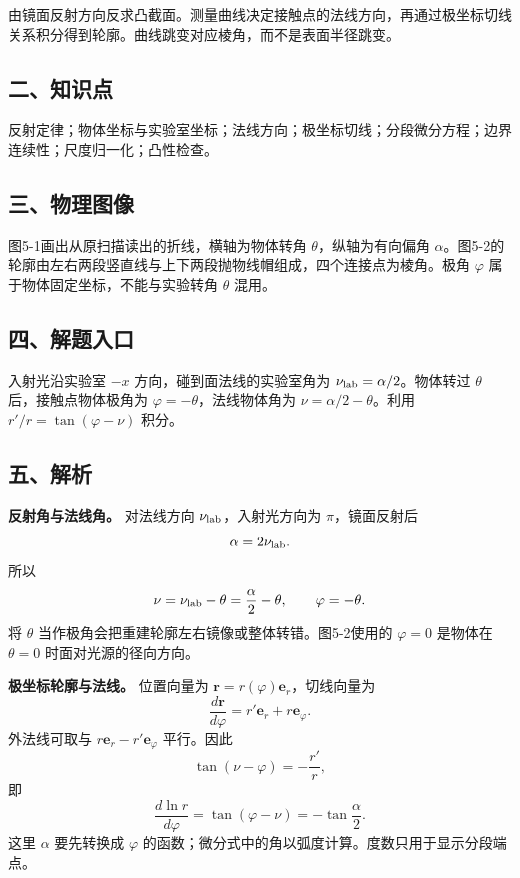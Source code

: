 \documentclass[12pt,a4paper,UTF8]{ctexart}
\begin{document}
由镜面反射方向反求凸截面。测量曲线决定接触点的法线方向，再通过极坐标切线关系积分得到轮廓。曲线跳变对应棱角，而不是表面半径跳变。

\subsection{二、知识点}\label{ux4e8cux77e5ux8bc6ux70b9-4}

反射定律；物体坐标与实验室坐标；法线方向；极坐标切线；分段微分方程；边界连续性；尺度归一化；凸性检查。

\subsection{三、物理图像}\label{ux4e09ux7269ux7406ux56feux50cf-4}

图5-1画出从原扫描读出的折线，横轴为物体转角 \(\theta\)，纵轴为有向偏角
\(\alpha\)。图5-2的轮廓由左右两段竖直线与上下两段抛物线帽组成，四个连接点为棱角。极角
\(\varphi\) 属于物体固定坐标，不能与实验转角 \(\theta\) 混用。

\subsection{四、解题入口}\label{ux56dbux89e3ux9898ux5165ux53e3-4}

入射光沿实验室 \(-x\) 方向，碰到面法线的实验室角为
\(\nu_{\rm lab}=\alpha/2\)。物体转过 \(\theta\) 后，接触点物体极角为
\(\varphi=-\theta\)，法线物体角为 \(\nu=\alpha/2-\theta\)。利用
\(r'/r=\tan(\varphi-\nu)\) 积分。

\subsection{五、解析}\label{ux4e94ux89e3ux6790-4}

\textbf{反射角与法线角。} 对法线方向 \(\nu_{\rm lab}\)，入射光方向为
\(\pi\)，镜面反射后 \[
\alpha=2\nu_{\rm lab}.
\] 所以 \[
\nu=\nu_{\rm lab}-\theta=\frac{\alpha}{2}-\theta,
\qquad\varphi=-\theta.
\] 将 \(\theta\) 当作极角会把重建轮廓左右镜像或整体转错。图5-2使用的
\(\varphi=0\) 是物体在 \(\theta=0\) 时面对光源的径向方向。

\textbf{极坐标轮廓与法线。} 位置向量为
\(\boldsymbol r=r(\varphi)\boldsymbol e_r\)，切线向量为 \[
\frac{d\boldsymbol r}{d\varphi}
=r'\boldsymbol e_r+r\boldsymbol e_\varphi.
\] 外法线可取与 \(r\boldsymbol e_r-r'\boldsymbol e_\varphi\) 平行。因此
\[
\tan(\nu-\varphi)=-\frac{r'}r,
\] 即 \[
\boxed{\frac{d\ln r}{d\varphi}
=\tan(\varphi-\nu)
=-\tan\frac{\alpha}{2}}.
\] 这里 \(\alpha\) 要先转换成 \(\varphi\)
的函数；微分式中的角以弧度计算。度数只用于显示分段端点。
\end{document}
